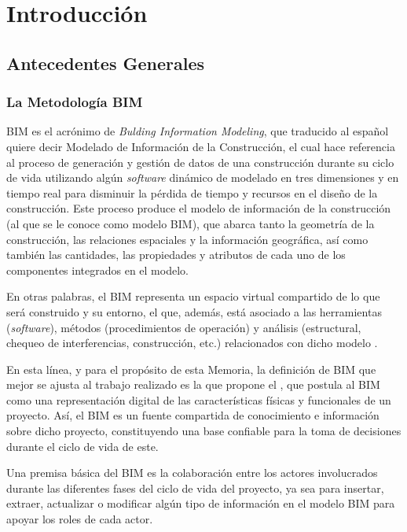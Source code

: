 \chapter{Introducción}

\section{Antecedentes Generales}

\subsection{La Metodología BIM}

BIM es el acrónimo de \emph{Bulding Information Modeling}, que traducido al español quiere decir Modelado de Información de la Construcción, el cual hace referencia al proceso de generación y gestión de datos de una construcción durante su ciclo de vida utilizando algún \emph{software} dinámico de modelado en tres dimensiones y en tiempo real para disminuir la pérdida de tiempo y recursos en el diseño de la construcción. Este proceso produce el modelo de información de la construcción (al que se le conoce como modelo BIM), que abarca tanto la geometría de la construcción, las relaciones espaciales y la información geográfica, así como también las cantidades, las propiedades y atributos de cada uno de los componentes integrados en el modelo.

En otras palabras, el BIM representa un espacio virtual compartido de lo que será construido y su entorno, el que, además, está asociado a las herramientas (\emph{software}), métodos (procedimientos de operación) y análisis (estructural, chequeo de interferencias, construcción, etc.) relacionados con dicho modelo \cite{saldias2010estimacion}.

En esta línea, y para el propósito de esta Memoria, la definición de BIM que mejor se ajusta al trabajo realizado es la que propone el , que postula al BIM como una representación digital de las características físicas y funcionales de un proyecto. Así, el BIM es un fuente compartida de conocimiento e información sobre dicho proyecto, constituyendo una base confiable para la toma de decisiones durante el ciclo de vida de este.

Una premisa básica del BIM es la colaboración entre los actores involucrados durante las diferentes fases del ciclo de vida del proyecto, ya sea para insertar, extraer, actualizar o modificar algún tipo de información en el modelo BIM para apoyar los roles de cada actor.

